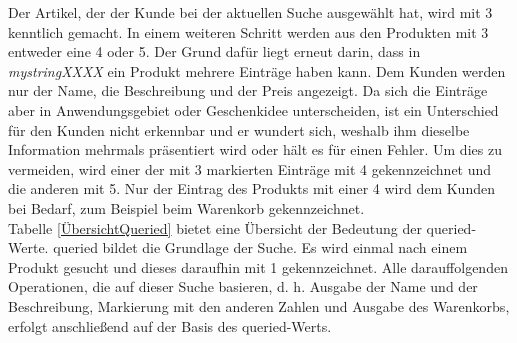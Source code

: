 Der Artikel, der der Kunde bei der aktuellen Suche ausgewählt hat, wird mit 3 kenntlich gemacht. In einem weiteren Schritt werden aus den Produkten mit 3 entweder eine 4 oder 5. Der Grund dafür liegt erneut darin, dass in \textit{mystringXXXX} ein Produkt mehrere Einträge haben kann. Dem Kunden werden nur der Name, die Beschreibung und der Preis angezeigt. Da sich die Einträge aber in Anwendungsgebiet oder Geschenkidee unterscheiden, ist ein Unterschied für den Kunden nicht erkennbar und er wundert sich, weshalb ihm dieselbe Information mehrmals präsentiert wird oder hält es für einen Fehler. Um dies zu vermeiden, wird einer der mit 3 markierten Einträge mit 4 gekennzeichnet und die anderen mit 5. Nur der Eintrag des Produkts mit einer 4 wird dem Kunden bei Bedarf, zum Beispiel beim Warenkorb gekennzeichnet.\\
Tabelle \ref{ÜbersichtQueried} bietet eine Übersicht der Bedeutung der queried-Werte.
queried bildet die Grundlage der Suche. Es wird einmal nach einem Produkt gesucht und dieses daraufhin mit 1 gekennzeichnet. Alle darauffolgenden Operationen, die auf dieser Suche basieren, d. h. Ausgabe der Name und der Beschreibung, Markierung mit den anderen Zahlen und Ausgabe des Warenkorbs, erfolgt anschließend auf der Basis des queried-Werts.\\



